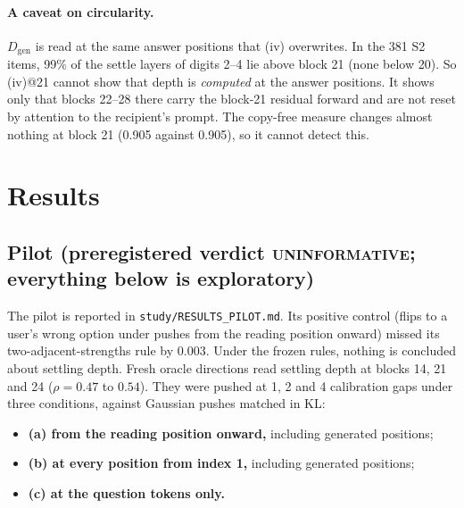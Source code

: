 \documentclass[11pt]{article}
\newcommand{\verdict}[1]{\textsc{\MakeLowercase{#1}}}
\begin{document}
\paragraph{A caveat on circularity.} $D_\text{gen}$ is read at the same answer positions that (iv) overwrites. In the 381 S2 items, 99\% of the settle layers of digits 2--4 lie above block 21 (none below 20). So (iv)@21 cannot show that depth is \emph{computed} at the answer positions. It shows only that blocks 22--28 there carry the block-21 residual forward and are not reset by attention to the recipient's prompt. The copy-free measure changes almost nothing at block 21 (0.905 against 0.905), so it cannot detect this.

\section{Results}

\subsection{Pilot (preregistered verdict \verdict{UNINFORMATIVE}; everything below is exploratory)}

The pilot is reported in \texttt{study/RESULTS\_PILOT.md}. Its positive control (flips to a user's wrong option under pushes from the reading position onward) missed its two-adjacent-strengths rule by 0.003. Under the frozen rules, nothing is concluded about settling depth. Fresh oracle directions read settling depth at blocks 14, 21 and 24 ($\rho = 0.47$ to $0.54$). They were pushed at 1, 2 and 4 calibration gaps under three conditions, against Gaussian pushes matched in KL:
\begin{itemize}
\item \textbf{(a) from the reading position onward,} including generated positions;
\item \textbf{(b) at every position from index 1,} including generated positions;
\item \textbf{(c) at the question tokens only.}
\end{itemize}
\end{document}

